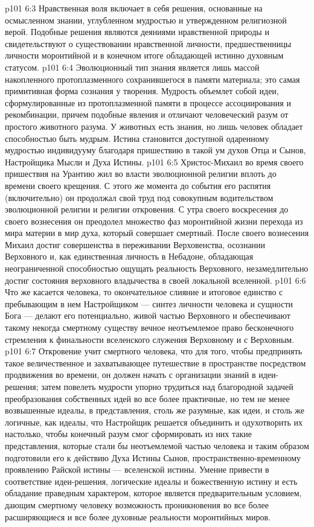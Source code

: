 \vs p101 6:3 \pc Нравственная воля включает в себя решения, основанные на осмысленном знании, углубленном мудростью и утвержденном религиозной верой. Подобные решения являются деяниями нравственной природы и свидетельствуют о существовании нравственной личности, предшественницы личности моронтийной и в конечном итоге обладающей истинно духовным статусом.
\vs p101 6:4 Эволюционный тип знания является лишь массой накопленного протоплазменного сохранившегося в памяти материала; это самая примитивная форма сознания у творения. Мудрость объемлет собой идеи, сформулированные из протоплазменной памяти в процессе ассоциирования и рекомбинации, причем подобные явления и отличают человеческий разум от простого животного разума. У животных есть знания, но лишь человек обладает способностью быть мудрым. Истина становится доступной одаренному мудростью индивидууму благодаря пришествию в такой ум духов Отца и Сынов, Настройщика Мысли и Духа Истины.
\vs p101 6:5 \pc Христос\hyp{}Михаил во время своего пришествия на Урантию жил во власти эволюционной религии вплоть до времени своего крещения. С этого же момента до события его распятия (включительно) он продолжал свой труд под совокупным водительством эволюционной религии и религии откровения. С утра своего воскресения до своего вознесения он преодолел множество фаз моронтийной жизни перехода из мира материи в мир духа, который совершает смертный. После своего вознесения Михаил достиг совершенства в переживании Верховенства, осознании Верховного и, как единственная личность в Небадоне, обладающая неограниченной способностью ощущать реальность Верховного, незамедлительно достиг состояния верховного владычества в своей локальной вселенной.
\vs p101 6:6 Что же касается человека, то окончательное слияние и итоговое единство с пребывающим в нем Настройщиком --- синтез личности человека и сущности Бога --- делают его потенциально, живой частью Верховного и обеспечивают такому некогда смертному существу вечное неотъемлемое право бесконечного стремления к финальности вселенского служения Верховному и с Верховным.
\vs p101 6:7 \pc Откровение учит смертного человека, что для того, чтобы предпринять такое величественное и захватывающее путешествие в пространстве посредством продвижения во времени, он должен начать с организации знаний в идеи\hyp{}решения; затем повелеть мудрости упорно трудиться над благородной задачей преобразования собственных идей во все более практичные, но тем не менее возвышенные идеалы, в представления, столь же разумные, как идеи, и столь же логичные, как идеалы, что Настройщик решается объединить и одухотворить их настолько, чтобы конечный разум смог сформировать из них такие представления, которые стали бы неотъемлемой частью человека и таким образом подготовили его к действию Духа Истины Сынов, пространственно\hyp{}временному проявлению Райской истины --- вселенской истины. Умение привести в соответствие идеи\hyp{}решения, логические идеалы и божественную истину и есть обладание праведным характером, которое является предварительным условием, дающим смертному человеку возможность проникновения во все более расширяющиеся и все более духовные реальности моронтийных миров.
